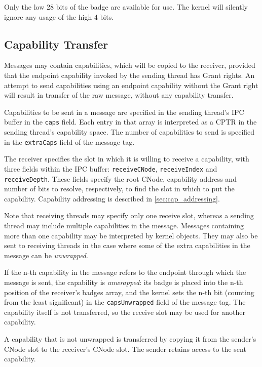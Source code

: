 Only the low 28 bits of the badge are available for use. The kernel will
silently ignore any usage of the high 4 bits.

\subsection{Capability Transfer}
\label{sec:cap-transfer}

Messages may contain capabilities, which will be copied to the
receiver, provided that the endpoint capability
invoked by the sending thread has Grant rights. An attempt to send
capabilities using an endpoint capability without the Grant right will
result in transfer of the raw message, without any capability transfer.

Capabilities to be sent in a message are specified in the sending thread's
IPC buffer in the \texttt{caps} field. Each entry in that array is interpreted
as a CPTR in the sending thread's capability space. The number of capabilities
to send is specified in the \texttt{extraCaps} field of the message tag.

The receiver specifies the slot
in which it is willing to receive a capability, with three fields within the IPC buffer: \texttt{receiveCNode}, \texttt{receiveIndex} and \texttt{receiveDepth}.
These fields specify the root CNode, capability address and number of bits to resolve, respectively, to find
the slot in which to put the capability. Capability
addressing is described in \autoref{sec:cap_addressing}.

Note that receiving threads may specify only one receive slot, whereas a
sending thread may include multiple capabilities in the message. Messages
containing more than one capability may be interpreted by kernel objects. They
may also be sent to receiving threads in the case where some of the extra
capabilities in the message can be \emph{unwrapped}.

If the n-th capability in the message refers to the endpoint through
which the message is sent, the capability is \emph{unwrapped}: its badge is placed into
the n-th
position of the receiver's badges array, and the kernel sets the n-th bit (counting from the
least significant) in the \texttt{capsUnwrapped} field of the message
tag. The capability itself is not transferred, so the receive slot may be used
for another capability.

A capability that is not unwrapped is transferred by copying it from the
sender's CNode slot to the receiver's CNode slot. The sender retains access
to the sent capability.

